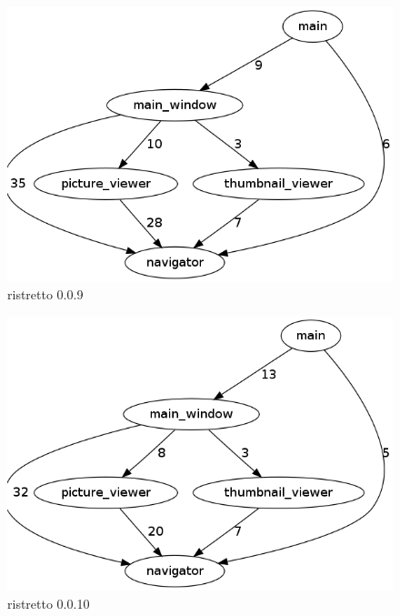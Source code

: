 \begin{figure}[h]
\center
\includegraphics[scale=0.4]{imagens/ristretto-0_0_9-doxyparse-2}
\caption{ristretto 0.0.9}
\label{fig:ristretto-0.0.9-doxyparse-2-anexo}
\end{figure}

\begin{figure}[h]
\center
\includegraphics[scale=0.4]{imagens/ristretto-0_0_10-doxyparse-2}
\caption{ristretto 0.0.10}
\label{fig:ristretto-0.0.10-doxyparse-2-anexo}
\end{figure}

